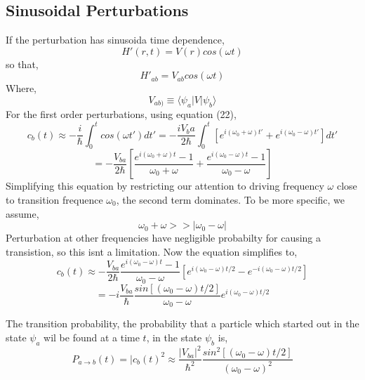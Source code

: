\subsection{Sinusoidal Perturbations}
If the perturbation has sinusoida time dependence,
\begin{equation}
	H'(r,t)=V(r)cos(\omega t)
\end{equation}
so that,
\begin{equation}
	H'_{ab}=V_{ab}cos(\omega t)
\end{equation}
Where,
\begin{equation}
	V_{ab)}\equiv \langle\psi_a|V|\psi_b\rangle
\end{equation}
For the first order perturbations, using equation (22),
\begin{equation}
	c_b(t)\approx -\frac{i}{\hbar}\int_{0}^{t}cos(\omega t')dt'=-\frac{iV_ba}{2\hbar}\int_{0}^{t}\left[e^{i(\omega_0+\omega)t'}+e^{i(\omega_0-\omega)t'}\right]dt'
\end{equation}
\begin{equation}
	=-\frac{V_{ba}}{2\hbar}\left[\frac{e^{i(\omega_0+\omega)t}-1}{\omega_0+\omega}	+ \frac{e^{i(\omega_0-\omega)t}-1}{\omega_0-\omega}	\right]
\end{equation}
Simplifying this equation by restricting our attention to driving frequency $\omega$ close to transition frequence $\omega_0$, the second term dominates. To be more specific, we assume,
\begin{equation}
	\omega_0+\omega>>|\omega_0-\omega|
\end{equation}
Perturbation at other frequencies have negligible probabilty for causing a transistion, so this isnt a limitation. Now the equation simplifies to,
\begin{equation*}
	c_b(t)\approx-\frac{V_{ba}}{2\hbar} \frac{e^{i(\omega_0-\omega)t}-1}{\omega_0-\omega}[e^{i(\omega_0-\omega)t/2}-e^{-i(\omega_0-\omega)t/2}]
\end{equation*}
\begin{equation}
	=-i\frac{V_{ba}}{\hbar}\frac{sin[(\omega_0-\omega) t/2]}{\omega_0-\omega}e^{i(\omega_0-\omega)t/2}
\end{equation}

The transition probability, the probability that a particle which started out in the state $ \psi_a $ wil be found at a time $t$, in the state $\psi_b$ is,
\begin{equation}
	P_{a\rightarrow b}(t)=|c_b(t)^2\approx \frac{|V_{ba}|^2}{\hbar^2}\frac{sin^2[(\omega_0-\omega) t/2]}{(\omega_0-\omega)^2}
\end{equation}	


